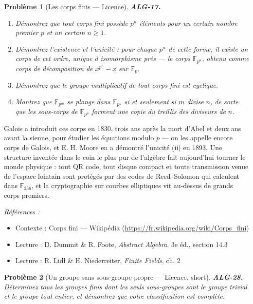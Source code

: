 \documentclass[11pt]{article}
\newtheorem{problem}{Problème}
\newenvironment{refs}{\par\small\noindent\emph{Références :}\begin{itemize}\setlength\itemsep{0pt}}{\end{itemize}\normalsize}
\begin{document}
\begin{problem}[{Les corps finis --- Licence}]
\textbf{ALG-17.} \begin{enumerate}
\item[(i)] Démontrez que tout corps fini possède $p^n$ éléments pour un
certain nombre premier $p$ et un certain $n \ge 1$.
\item[(ii)] Démontrez l'existence et l'unicité : pour chaque $p^n$
de cette forme, il existe un corps de cet ordre, unique à isomorphisme près --- le corps $\mathbb{F}_{p^n}$,
obtenu comme corps de décomposition de $x^{p^n} - x$ sur $\mathbb{F}_p$.
\item[(iii)] Démontrez que le
groupe multiplicatif de tout corps fini est cyclique.
\item[(iv)] Montrez que $\mathbb{F}_{p^m}$ se plonge
dans $\mathbb{F}_{p^n}$ si et seulement si $m$ divise $n$, de sorte que les sous-corps de
$\mathbb{F}_{p^n}$ forment une copie du treillis des diviseurs de $n$.
\end{enumerate}

\end{problem}

\noindent Galois a introduit ces corps en 1830, trois ans après la mort d'Abel et deux ans avant la
sienne, pour étudier les équations modulo $p$ --- on les appelle encore corps de Galois, et E. H. Moore en a
démontré l'unicité (ii) en 1893. Une structure inventée dans le coin le plus pur de l'algèbre fait aujourd'hui
tourner le monde physique : tout QR code, tout disque compact et toute transmission venue de l'espace lointain
sont protégés par des codes de Reed--Solomon qui calculent dans $\mathbb{F}_{256}$, et la cryptographie sur
courbes elliptiques vit au-dessus de grands corps premiers.

\begin{refs}
\item Contexte : Corps fini --- Wikipédia (\url{https://fr.wikipedia.org/wiki/Corps_fini})
\item Lecture : D. Dummit \& R. Foote, \textit{Abstract Algebra}, 3e éd., section 14.3
\item Lecture : R. Lidl \& H. Niederreiter, \textit{Finite Fields}, ch. 2
\end{refs}

\bigskip

\begin{problem}[{Un groupe sans sous-groupe propre --- Licence, short}]
\textbf{ALG-28.} Déterminez tous les groupes finis dont les seuls sous-groupes sont le groupe trivial et le groupe tout entier, et démontrez que votre classification est complète.
\end{problem}
\end{document}
